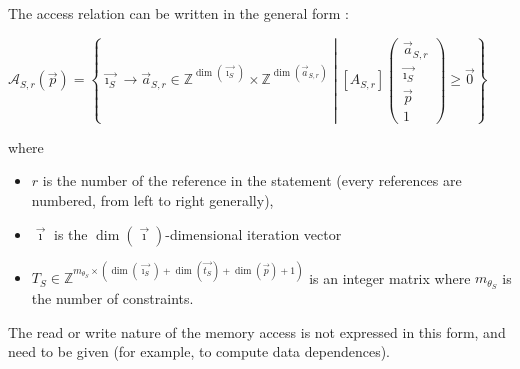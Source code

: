 \documentclass[paper=a4, fontsize=11.5pt]{scrartcl}
\numberwithin{equation}{section}        %
\numberwithin{figure}{section}          %
\numberwithin{table}{section}               %
\begin{document}
        The access relation can be written in the general form :
        \begin{center}
            $\mathcal{A}_{S,r}(\vec{p}) = 
            \left\{
                \vec{\imath_S} \to \vec{a}_{S,r} \in \mathbb{Z}^{\dim(\vec{\imath_S})}\times\mathbb{Z}^{\dim(\vec{a}_{S,r})}
                \middle|
                \left[A_{S,r}\right]\left(\begin{array}{c}\vec{a}_{S,r}\\\vec{\imath_S}\\\vec{p}\\1\end{array}\right)
                \geq \vec{0}
            \right\}$
        \end{center}
        where 
        \begin{itemize}
            \item $r$ is the number of the reference in the statement (every references are
                numbered, from left to right generally),
            \item $\vec{\imath}$ is the $\dim(\vec{\imath})$-dimensional iteration vector
            \item $T_S \in \mathbb{Z}^{m_{\theta_S}\times(\dim(\vec{\imath_S})+\dim(\vec{t_S})+\dim(\vec{p})+1)}$
                is an integer matrix where $m_{\theta_S}$ is the number of constraints.
        \end{itemize}

        The read or write nature of the memory access is not expressed in this form,
        and need to be given (for example, to compute data dependences).

\end{document}
